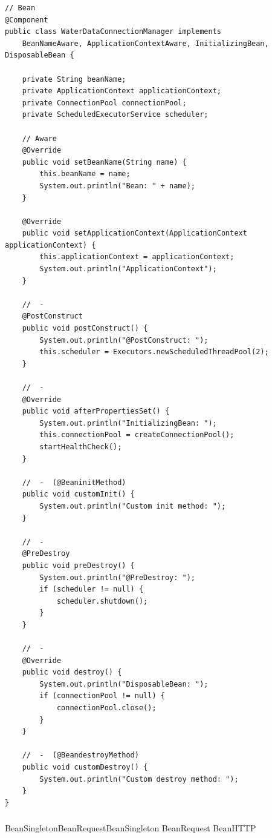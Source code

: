 \begin{lstlisting}[style=java]
// Bean
@Component
public class WaterDataConnectionManager implements 
    BeanNameAware, ApplicationContextAware, InitializingBean, DisposableBean {
    
    private String beanName;
    private ApplicationContext applicationContext;
    private ConnectionPool connectionPool;
    private ScheduledExecutorService scheduler;
    
    // Aware
    @Override
    public void setBeanName(String name) {
        this.beanName = name;
        System.out.println("Bean: " + name);
    }
    
    @Override
    public void setApplicationContext(ApplicationContext applicationContext) {
        this.applicationContext = applicationContext;
        System.out.println("ApplicationContext");
    }
    
    //  - 
    @PostConstruct
    public void postConstruct() {
        System.out.println("@PostConstruct: ");
        this.scheduler = Executors.newScheduledThreadPool(2);
    }
    
    //  - 
    @Override
    public void afterPropertiesSet() {
        System.out.println("InitializingBean: ");
        this.connectionPool = createConnectionPool();
        startHealthCheck();
    }
    
    //  -  (@BeaninitMethod)
    public void customInit() {
        System.out.println("Custom init method: ");
    }
    
    //  - 
    @PreDestroy
    public void preDestroy() {
        System.out.println("@PreDestroy: ");
        if (scheduler != null) {
            scheduler.shutdown();
        }
    }
    
    //  - 
    @Override
    public void destroy() {
        System.out.println("DisposableBean: ");
        if (connectionPool != null) {
            connectionPool.close();
        }
    }
    
    //  -  (@BeandestroyMethod)
    public void customDestroy() {
        System.out.println("Custom destroy method: ");
    }
}
\end{lstlisting}

\hypertarget{section-56}{%
\subsubsection{}\label{section-56}}

Bean\important{}SingletonBeanRequestBeanSingleton BeanRequest BeanHTTP

